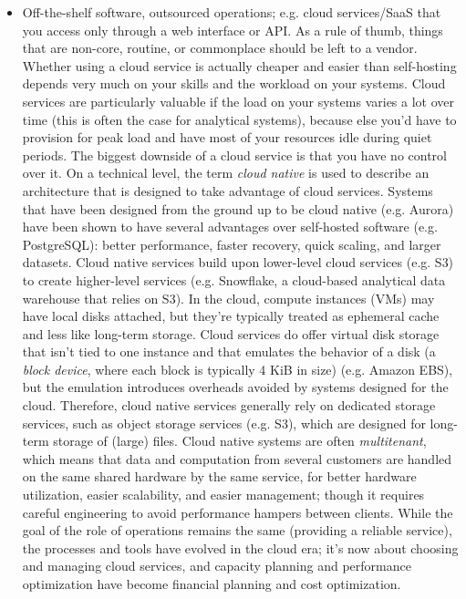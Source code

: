 \documentclass[table, xcdraw]{article}%
\begin{document}
\begin{itemize}
    \item Off-the-shelf software, outsourced operations; e.g. cloud services/SaaS that you access only through a web interface or API. As a rule of thumb, things that are non-core, routine, or commonplace should be left to a vendor. Whether using a cloud service is actually cheaper and easier than self-hosting depends very much on your skills and the workload on your systems. Cloud services are particularly valuable if the load on your systems varies a lot over time (this is often the case for analytical systems), because else you'd have to provision for peak load and have most of your resources idle during quiet periods. The biggest downside of a cloud service is that you have no control over it. On a technical level, the term \textit{cloud native} is used to describe an architecture that is designed to take advantage of cloud services. Systems that have been designed from the ground up to be cloud native (e.g. Aurora) have been shown to have several advantages over self-hosted software (e.g. PostgreSQL): better performance, faster recovery, quick scaling, and larger datasets. Cloud native services build upon lower-level cloud services (e.g. S3) to create higher-level services (e.g. Snowflake, a cloud-based analytical data warehouse that relies on S3). In the cloud, compute instances (VMs) may have local disks attached, but they're typically treated as ephemeral cache and less like long-term storage. Cloud services do offer virtual disk storage that isn't tied to one instance and that emulates the behavior of a disk (a \textit{block device}, where each block is typically 4 KiB in size) (e.g. Amazon EBS), but the emulation introduces overheads avoided by systems designed for the cloud. Therefore, cloud native services generally rely on dedicated storage services, such as object storage services (e.g. S3), which are designed for long-term storage of (large) files. Cloud native systems are often \textit{multitenant}, which means that data and computation from several customers are handled on the same shared hardware by the same service, for better hardware utilization, easier scalability, and easier management; though it requires careful engineering to avoid performance hampers between clients. While the goal of the role of operations remains the same (providing a reliable service), the processes and tools have evolved in the cloud era; it's now about choosing and managing cloud services, and capacity planning and performance optimization have become financial planning and cost optimization.
\end{itemize}
\end{document}
